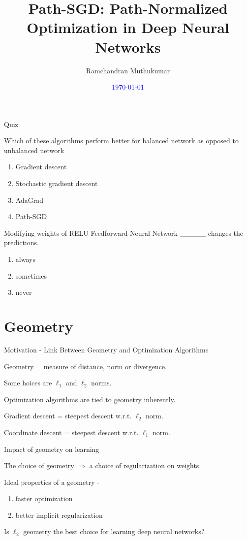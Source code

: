 \documentclass[presentation,xcolor={usenames,dvipsnames},10pt]{beamer}
\title{Path-SGD: Path-Normalized Optimization in Deep Neural Networks}
\date{\textcolor{blue}{\today}}
\author{Ramchandran Muthukumar}
\newcommand{\RSGD}{Path-SGD }
\begin{document}
\begin{frame}
\titlepage
\end{frame}


\begin{frame}{Quiz}
\bit 
\item Which of these algorithms perform better for balanced network as opposed to unbalanced network 
\begin{enumerate}
	\item Gradient descent
	\item Stochastic gradient descent
	\item AdaGrad
	\item \RSGD
\end{enumerate}

\item Modifying weights of RELU Feedforward Neural Network \_\_\_\_\_ changes the predictions.  
\begin{enumerate}
	\item always 
	\item sometimes
	\item never 
\end{enumerate}
\eit 	
\end{frame}



\section{Geometry}

\begin{frame}{Motivation - Link Between Geometry and Optimization Algorithms}
\bit 
\item Geometry = measure of distance, norm or divergence. 

\item Some hoices are $\ell_1$ and $\ell_2$ norms. 

\item Optimization algorithms are tied to geometry inherently. 

\item Gradient descent = steepest descent w.r.t. $\ell_2$ norm. 

\item Coordinate descent = steepest descent w.r.t.  $\ell_1$ norm. 

\eit 
\end{frame}

\begin{frame}{Impact of geometry on learning}
\bit 

\item The choice of geometry $\Rightarrow$ a choice of regularization on weights. 

\item Ideal properties of a geometry -
\begin{enumerate}
	\item faster optimization
	\item better implicit regularization 
\end{enumerate}
\item Is $\ell_2$ geometry the best choice for learning deep neural networks?
\eit 
\end{frame}
\end{document}
